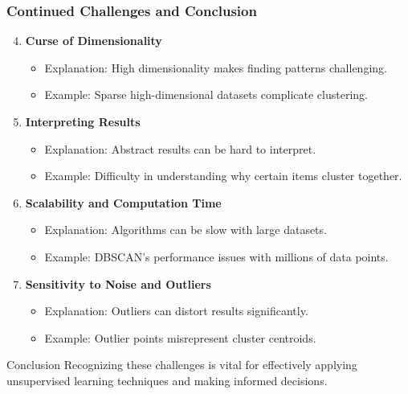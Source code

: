 \documentclass[aspectratio=169]{beamer}
\begin{document}
\begin{frame}[fragile]
    \frametitle{Continued Challenges and Conclusion}

    \begin{enumerate}
        \setcounter{enumi}{3} %
        \item \textbf{Curse of Dimensionality}
        \begin{itemize}
            \item Explanation: High dimensionality makes finding patterns challenging.
            \item Example: Sparse high-dimensional datasets complicate clustering.
        \end{itemize}

        \item \textbf{Interpreting Results}
        \begin{itemize}
            \item Explanation: Abstract results can be hard to interpret.
            \item Example: Difficulty in understanding why certain items cluster together.
        \end{itemize}

        \item \textbf{Scalability and Computation Time}
        \begin{itemize}
            \item Explanation: Algorithms can be slow with large datasets.
            \item Example: DBSCAN's performance issues with millions of data points.
        \end{itemize}

        \item \textbf{Sensitivity to Noise and Outliers}
        \begin{itemize}
            \item Explanation: Outliers can distort results significantly.
            \item Example: Outlier points misrepresent cluster centroids.
        \end{itemize}
    \end{enumerate}

    \begin{block}{Conclusion}
        Recognizing these challenges is vital for effectively applying unsupervised learning techniques and making informed decisions.
    \end{block}
\end{frame}
\end{document}
